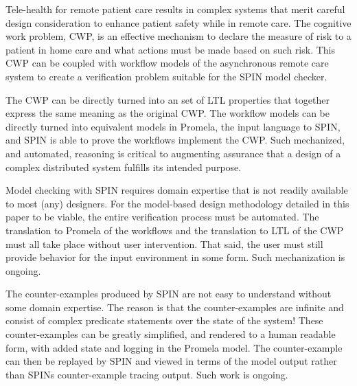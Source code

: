 Tele-health for remote patient care results in complex systems that merit careful design consideration to enhance patient safety while in remote care. The cognitive work problem, CWP, is an effective mechanism to declare the measure of risk to a patient in home care and what actions must be made based on such risk. This CWP can be coupled with workflow models of the asynchronous remote care system to create a verification problem suitable for the SPIN model checker.

The CWP can be directly turned into an set of LTL properties that together express the same meaning as the original CWP. The workflow models can be directly turned into equivalent models in Promela, the input language to SPIN, and SPIN is able to prove the workflows implement the CWP. Such mechanized, and automated, reasoning is critical to augmenting assurance that a design of a complex distributed system fulfills its intended purpose. 

Model checking with SPIN requires domain expertise that is not readily available to most (any) designers. For the model-based design methodology detailed in this paper to be viable, the entire verification process must be automated. The translation to Promela of the workflows and the translation to LTL of the CWP must all take place without user intervention. That said, the user must still provide behavior for the input environment in some form. Such mechanization is ongoing.

The counter-examples produced by SPIN are not easy to understand without some domain expertise. The reason is that the counter-examples are infinite and consist of complex predicate statements over the state of the system! These counter-examples can be greatly simplified, and rendered to a human readable form, with added state and logging in the Promela model. The counter-example can then be replayed by SPIN and viewed in terms of the model output rather than SPINs counter-example tracing output. Such work is ongoing.
